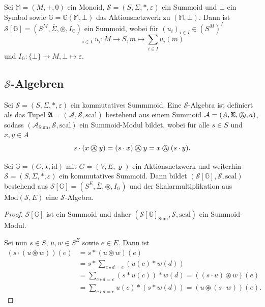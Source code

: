 \documentclass{article}
\DeclareMathOperator*{\Sigmacirc}{%
  \ThisStyle{\mathop{\ensurestackMath{\stackinset{c}{-0.75\LMpt}{c}{}{%
  \rotatebox[origin=lb]{-90}{$\circ$}}{\SavedStyle\Sigma}}}}}
\DeclareMathOperator*{\sumbar}{\overline{\sum}}
\newcommand{\algebra}{\mathbin{
  \mathchoice
    {\mbox{\normalsize\textcircled{\scriptsize A}}}
    {\mbox{\normalsize\textcircled{\scriptsize A}}}
    {\mbox{\scriptsize\textcircled{\tiny A}}}
    {\mbox{\tiny\textcircled{\fontsize{3.5}{3.5}\selectfont A}}}
  }
}
\begin{document}
\begin{example}
  Sei $\mathbb{M} = (M, +, 0)$ ein Monoid,
  $\mathcal{S} = (S, \Sigma, \ast , \varepsilon)$ ein Summoid
  und $\bot$ ein Symbol
  sowie $\mathbb{G} = \mathbb{G}(\mathbb{M}, \bot)$ das Aktionsnetzwerk zu $(\mathbb{M}, \bot)$.
  Dann ist $\mathcal{S}[\mathbb{G}] = (S^M, \bar\Sigma, \circledast, I_\mathbb{G})$ ein Summoid,
  wobei für $(u_i)_{i \in I} \in (S^M)^I$
  \begin{equation*}
    \sumbar_{i \in I} u_i \colon M \to S, m \mapsto \sum_{i \in I} u_i(m)
  \end{equation*}
  und $I_\mathbb{G} \colon \{\bot\} \to M, \bot \mapsto \varepsilon$.
\end{example}

\subsection{$\mathcal{S}$-Algebren}

\begin{definition}
  Sei $\mathcal{S} = (S, \Sigma, \ast, \varepsilon)$ ein kommutatives Summmoid.
  Eine $\mathcal{S}$-Algebra ist definiert als das Tupel $\mathfrak{A} = (\mathcal{A}, \mathcal{S}, \text{scal})$
  bestehend aus einem Summoid $\mathcal{A} = (A, \Sigmacirc, \algebra, a)$,
  sodass $(\mathcal{A}_\text{Sum}, \mathcal{S}, \text{scal})$ ein Summoid-Modul bildet,
  wobei für alle $s \in S$ und $x, y \in A$
  \begin{equation*}
    s \cdot (x \algebra y) = (s \cdot x) \algebra y = x \algebra (s \cdot y).
  \end{equation*}
\end{definition}

\begin{theorem}
  Sei $\mathbb{G} = (G, \star, \text{id})$ mit $G = (V, E, \varrho)$ ein Aktionsnetzwerk
  und weiterhin $\mathcal{S} = (S, \Sigma, \ast, \varepsilon)$ ein kommutatives Summoid.
  Dann bildet $(\mathcal{S}[\mathbb{G}], \mathcal{S}, \text{scal})$
  bestehend aus $\mathcal{S}[\mathbb{G}] = (S^E, \bar\Sigma, \circledast, I_\mathbb{G})$
  und der Skalarmultiplikation aus $\text{Mod}(\mathcal{S}, E)$
  eine $\mathcal{S}$-Algebra.
\end{theorem}
\begin{proof}
  $\mathcal{S}[\mathbb{G}]$ ist ein Summoid
  und daher $(\mathcal{S}[\mathbb{G}]_\text{Sum}, \mathcal{S}, \text{scal})$ ein Summoid-Modul.

  Sei nun $s \in S$, $u, w \in S^E$ sowie $e \in E$.
  Dann ist
  \begin{align*}
    (s \cdot (u \circledast w))(e)
    &= s \ast (u \circledast w)(e) \\
    &= s \ast \sum_{c \star d = e} (u(c) \ast w(d)) \\
    &= \sum_{c \star d = e} (s \ast u(c)) \ast w(d) = ((s \cdot u) \circledast w)(e) \\
    &= \sum_{c \star d = e} u(c) \ast (s \ast w(d)) = (u \circledast (s \cdot w))(e).
  \end{align*}
\end{proof}
\end{document}
